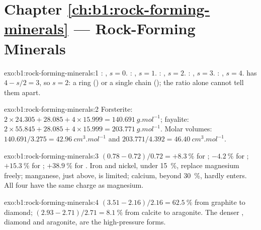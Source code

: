 \section*{Chapter \ref{ch:b1:rock-forming-minerals} --- Rock-Forming Minerals}

\begin{solution}{exo:b1:rock-forming-minerals:1}
: , $s = 0$. : ,
$s = 1$. : , $s = 2$. :
, $s = 3$. : , $s = 4$. 
has $4 - s/2 = 3$, so $s = 2$: a ring () or a single chain
(); the ratio alone cannot tell them apart.
\end{solution}

\begin{solution}{exo:b1:rock-forming-minerals:2}
Forsterite: $2\times24.305 + 28.085 + 4\times15.999 =
\qty{140.691}{g.mol^{-1}}$; fayalite: $2\times55.845 + 28.085 +
4\times15.999 = \qty{203.771}{g.mol^{-1}}$. Molar volumes:
$140.691/3.275 = \qty{42.96}{cm^3.mol^{-1}}$ and $203.771/4.392 =
\qty{46.40}{cm^3.mol^{-1}}$.
\end{solution}

\begin{solution}{exo:b1:rock-forming-minerals:3}
$(0.78 - 0.72)/0.72 = +\qty{8.3}{\percent}$ for ;
$-\qty{4.2}{\percent}$ for ; $+\qty{15.3}{\percent}$ for
; $+\qty{38.9}{\percent}$ for . Iron and nickel,
under \qty{15}{\percent}, replace magnesium freely; manganese, just above, is
limited; calcium, beyond \qty{30}{\percent}, hardly enters. All four have the
same charge as magnesium.
\end{solution}

\begin{solution}{exo:b1:rock-forming-minerals:4}
$(3.51 - 2.16)/2.16 = \qty{62.5}{\percent}$ from graphite to diamond;
$(2.93 - 2.71)/2.71 = \qty{8.1}{\percent}$ from calcite to aragonite. The
denser , diamond and aragonite, are the high-pressure forms.
\end{solution}

